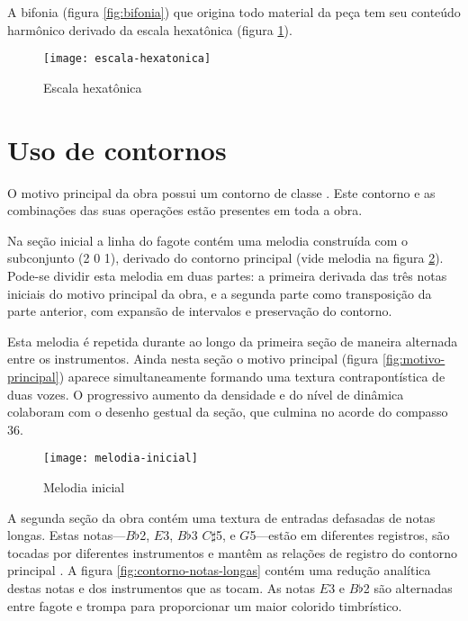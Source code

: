 A bifonia (figura \ref{fig:bifonia}) que origina todo material da peça
tem seu conteúdo harmônico derivado da escala hexatônica (figura
\ref{fig:escala-hexatonica}).

\begin{figure}
  \centering
  \texttt{[image: escala-hexatonica]}
  \caption{Escala hexatônica}
  \label{fig:escala-hexatonica}
\end{figure}

\section{Uso de contornos}
\label{sec:uso-de-contornos}

O motivo principal da obra possui um contorno de classe
\contpr{}. Este contorno e as combinações das suas operações estão
presentes em toda a obra.

Na seção inicial a linha do fagote contém uma melodia construída com o
subconjunto (2 0 1), derivado do contorno principal (vide melodia na
figura \ref{fig:melodia-inicial}). Pode-se dividir esta melodia em
duas partes: a primeira derivada das três notas iniciais do motivo
principal da obra, e a segunda parte como transposição da parte
anterior, com expansão de intervalos e preservação do contorno.

Esta melodia é repetida durante ao longo da primeira seção de maneira
alternada entre os instrumentos. Ainda nesta seção o motivo principal
(figura \ref{fig:motivo-principal}) aparece simultaneamente formando
uma textura contrapontística de duas vozes. O progressivo aumento da
densidade e do nível de dinâmica colaboram com o desenho gestual da
seção, que culmina no acorde do compasso 36.

\begin{figure}
  \centering
  \texttt{[image: melodia-inicial]}
  \caption{Melodia inicial}
  \label{fig:melodia-inicial}
\end{figure}

A segunda seção da obra contém uma textura de entradas defasadas de
notas longas. Estas notas---$B\flat$2, $E$3, $B\flat$3 $C\sharp$5, e
$G$5---estão em diferentes registros, são tocadas por diferentes
instrumentos e mantêm as relações de registro do contorno principal
\contpr{}. A figura \ref{fig:contorno-notas-longas} contém uma redução
analítica destas notas e dos instrumentos que as tocam. As notas $E$3
e $B\flat$2 são alternadas entre fagote e trompa para proporcionar um
maior colorido timbrístico.

